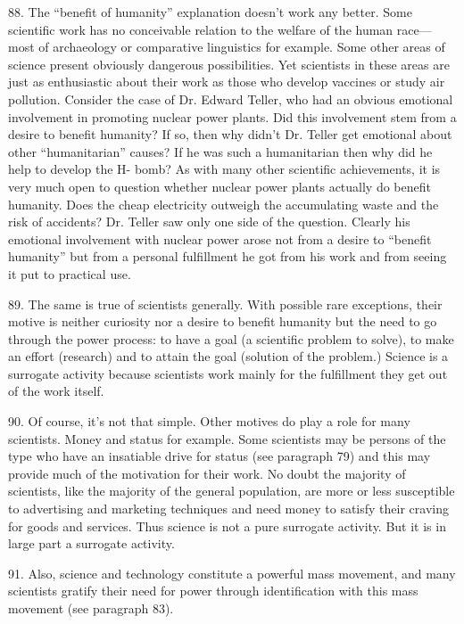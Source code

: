 \documentclass{article}
\begin{document}
88. The “benefit of humanity” explanation doesn’t work any better. Some scientific work has no 
conceivable relation to the welfare of the human race—most of archaeology or comparative 
linguistics for example. Some other areas of science present obviously dangerous 
possibilities. Yet scientists in these areas are just as enthusiastic about their work as those who 
develop vaccines or study air pollution. Consider the case of Dr. Edward Teller, who had an 
obvious emotional involvement in promoting nuclear power plants. Did this involvement stem 
from a desire to benefit humanity? If so, then why didn’t Dr. Teller get emotional about other 
“humanitarian” causes? If he was such a humanitarian then why did he help to develop the H-
bomb? As with many other scientific achievements, it is very much open to question whether 
nuclear power plants actually do benefit humanity. Does the cheap electricity outweigh the 
accumulating waste and the risk of accidents? Dr. Teller saw only one side of the question. Clearly 
his emotional involvement with nuclear power arose not from a desire to “benefit humanity” but 
from a personal fulfillment he got from his work and from seeing it put to practical use. \vspace{\baselineskip} \newpage

89. The same is true of scientists generally. With possible rare exceptions, their motive is neither 
curiosity nor a desire to benefit humanity but the need to go through the power process: to have a 
goal (a scientific problem to solve), to make an effort (research) and to attain the goal (solution of 
the problem.) Science is a surrogate activity because scientists work mainly for the fulfillment they 
get out of the work itself. \vspace{\baselineskip}

90. Of course, it’s not that simple. Other motives do play a role for many scientists. Money and 
status for example. Some scientists may be persons of the type who have an insatiable drive for 
status (see paragraph 79) and this may provide much of the motivation for their work. No doubt 
the majority of scientists, like the majority of the general population, are more or less susceptible 
to advertising and marketing techniques and need money to satisfy their craving for goods and 
services. Thus science is not a pure surrogate activity. But it is in large part a surrogate activity. \vspace{\baselineskip}

91. Also, science and technology constitute a powerful mass movement, and many scientists 
gratify their need for power through identification with this mass movement (see paragraph 83). \vspace{\baselineskip}
\end{document}

